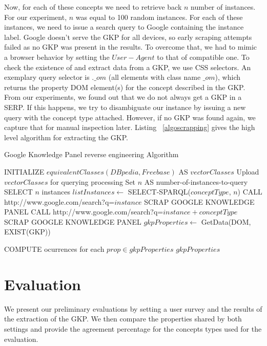 \documentclass[runningheads,a4paper]{llncs}
\begin{document}
Now, for each of these concepts we need to retrieve back $n$ number of instances. For our experiment, $n$ was equal to 100 random instances. For each of these instances, we need to issue a search query to Google containing the instance label. Google doesn't serve the GKP for all devices, so early scraping attempts failed as no GKP was present in the results. To overcome that, we had to mimic a browser behavior by setting the $User-Agent$ to that of compatible one.
To check the existence of and extract data from a GKP, we use CSS selectors. An exemplary query selector is $.\_om$ (all elements with class name $\_om$), which returns the property DOM element(s) for the concept described in the GKP. From our experiments, we found out that we do not always get a GKP in a SERP. If this happens, we try to disambiguate our instance by issuing a new query with the concept type attached. However, if no GKP was found again, we capture that for manual inspection later. Listing ~\ref{algoscrapping} gives the high level algorithm for extracting the GKP.

\begin{algorithm}[h]
\caption{Google Knowledge Panel reverse engineering Algorithm} \label{algoscrapping}
\begin{algorithmic}[1]
    \STATE INITIALIZE $equivalentClasses(DBpedia,Freebase) $ AS $vectorClasses$
    \STATE Upload $vectorClasses$ for querying processing
    \STATE Set $n$ AS number-of-instances-to-query
	\STATE SELECT $n$ instances
	\STATE $listInstances \leftarrow$ SELECT-SPARQL($conceptType$, $n$)
			\STATE CALL http://www.google.com/search?q=$instance$
				\STATE SCRAP GOOGLE KNOWLEDGE PANEL
			\ELSE
				\STATE CALL http://www.google.com/search?q=$instance + conceptType$
 				\STATE SCRAP GOOGLE KNOWLEDGE PANEL
			\ENDIF
			\STATE $gkpProperties \leftarrow$ GetData(DOM, EXIST(GKP))
			
		\ENDFOR
	\STATE COMPUTE ocurrences for each $prop \in gkpProperties$
    \ENDFOR
    \RETURN $gkpProperties$
\end{algorithmic}
\end{algorithm}


\section{Evaluation}
\label{sec:evaluation}
We present our preliminary evaluations by setting a user survey and the results of the extraction of the GKP. We then compare the properties shared by both settings and provide the agreement percentage for the concepts types used for the evaluation.
\end{document}

